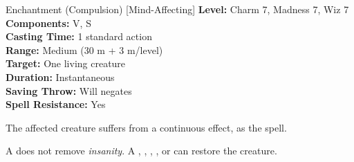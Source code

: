 {Enchantment (Compulsion) [Mind-Affecting]}
{
	\textbf{Level:}
	Charm 7, Madness 7, Wiz 7\\
	\textbf{Components:}
	V, S\\
	\textbf{Casting Time:}
	1 standard action\\
	\textbf{Range:}
	Medium (30 m + 3 m/level)\\
	\textbf{Target:}
	One living creature\\
	\textbf{Duration:}
	Instantaneous\\
	\textbf{Saving Throw:}
	Will negates\\
	\textbf{Spell Resistance:}
	Yes\\
}
{
	The affected creature suffers from a continuous  effect, as the spell.

	A  does not remove \emph{insanity}. A , , , , or  can restore the creature.

}
